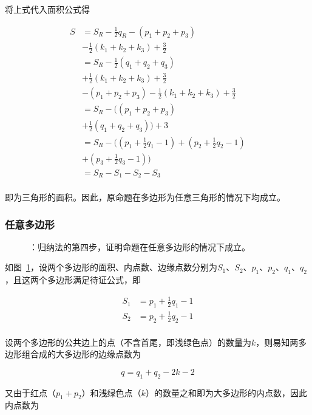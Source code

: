将上式代入面积公式得

\begin{align*}
  S &= S_R - \frac12q_R - (p_1 + p_2 + p_3) \\
  &- \frac12(k_1 + k_2 + k_3) + \frac32 \\
  &= S_R - \frac12(q_1 + q_2 + q_3) \\
  &+ \frac12(k_1 + k_2 + k_3) + \frac32 \\
  &-(p_1 + p_2 + p_3) - \frac12(k_1 + k_2 + k_3) + \frac32 \\
  &= S_R - \Bigg((p_1 + p_2 + p_3) \\
  &+ \frac12(q_1 + q_2 + q_3)\Bigg) + 3 \\
  &= S_R - \Bigg(\left(p_1 + \frac12q_1 - 1\right) + \left(p_2 + \frac12q_2 - 1\right) \\
  &+ \left(p_3 + \frac12q_3 - 1\right)\Bigg) \\
  &= S_R - S_1 - S_2 - S_3 \\
\end{align*}

即为三角形的面积。因此，原命题在多边形为任意三角形的情况下均成立。

\subsubsection{任意多边形} \label{subsubsec:0012-ind-poly}

\begin{figure}[htbp]
  \centering
  \caption{：归纳法的第四步，证明命题在任意多边形的情况下成立。}
  \label{fig:0012-ind-poly}
\end{figure}

如图~\ref{fig:0012-ind-poly}，设两个多边形的面积、内点数、边缘点数分别为$S_1$、$S_2$、$p_1$、$p_2$、$q_1$、$q_2$，且这两个多边形满足待证公式，即

\begin{align*}
  S_1 &= p_1 + \frac12q_1 - 1 \\
  S_2 &= p_2 + \frac12q_2 - 1 \\
\end{align*}

设两个多边形的公共边上的点（不含首尾，即浅绿色点）的数量为$k$，则易知两多边形组合成的大多边形的边缘点数为\footnotemark

\[ q = q_1 + q_2 - 2k - 2 \]

又由于红点（$p_1 + p_2$）和浅绿色点（$k$）的数量之和即为大多边形的内点数，因此内点数为

